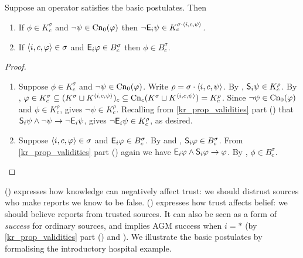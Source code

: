 \begin{proposition}
    \label{kr_prop_basic_postulates_consequences}
    Suppose an operator satisfies the basic postulates. Then
    \begin{enumerate}
        \item \label{kr_item_knowledge_trust_link} If $\phi \in K^\sigma_c$ and
              $\neg\psi \in \cnprop(\phi)$ then $\neg \E_i\psi \in K^{\sigma
              \concat \tuple{i, c, \psi}}_c$.
        \item \label{kr_item_trust_belief_link} If $\tuple{i, c, \phi} \in
              \sigma$ and $\E_i\phi \in B^\sigma_c$ then $\phi \in
              B^\sigma_c$.
    \end{enumerate}
\end{proposition}

\begin{proof}\leavevmode
    \begin{enumerate}

        \item Suppose $\phi \in K^\sigma_c$ and $\neg\psi \in \cnprop(\phi)$.
              Write $\rho = \sigma \concat \tuple{i, c, \psi}$. By
              \soundness{}, $\S_i\psi \in K^\rho_c$. By \kconj{}, $\phi \in
              K^\sigma_c \subseteq (K^\sigma \sqcup K^{\tuple{i, c, \psi}})_c
              \subseteq \cn_c(K^\sigma \sqcup K^{\tuple{i, c, \psi}}) =
              K^\rho_c$. Since $\neg\psi \in \cnprop(\phi)$ and $\phi \in
              K^\rho_c$, \closure{} gives $\neg\psi \in K^\rho_c$. Recalling
              from \cref{kr_prop_validities} part
              () that $\S_i\psi \land \neg
              \psi \rightarrow \neg \E_i\psi$, \closure{} gives $\neg
              \E_i\psi \in K^\rho_c$, as desired.

          \item Suppose $\tuple{i, c, \phi} \in \sigma$ and $\E_i\phi \in
                B^\sigma_c$. By \soundness{} and \containment{}, $\S_i\phi \in
                B^\sigma_c$. From \cref{kr_prop_validities} part
                () again we have $\E_i\phi
                \land \S_i\phi \rightarrow \phi$. By \closure{}, $\phi \in
                B^\sigma_c$.

    \end{enumerate}
\end{proof}

() expresses how knowledge can negatively
affect trust: we should distrust sources who make reports we know to be false.
() expresses how trust affects belief: we
should believe reports from trusted sources.
It can also be seen as a form of \emph{success} for ordinary sources, and
implies AGM success when $i = \ast$ (by \cref{kr_prop_validities} part
() and \closure{}). We illustrate the basic postulates
by formalising the introductory hospital example.

